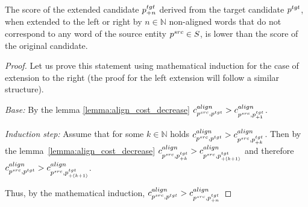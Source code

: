 \begin{corollary} \label{col:shrink_cand}
  The score of the extended candidate \( p_{+n}^{tgt} \) derived from the target
  candidate \( p^{tgt} \), when extended to the left or right by
  \( n \in \mathbb{N} \) non-aligned words that do not correspond to any word
  of the source entity \( p^{src} \in S \), is lower than the score of the original
  candidate.
\end{corollary}
\begin{proof}
  Let us prove this statement using mathematical induction for the case of extension to the right (the proof for the left extension will follow a similar structure).

  \textit{Base:} By the lemma \ref{lemma:align_cost_decrease} \( c_{p^{src}, p^{tgt}}^{align} > c_{p^{src}, p_{+1}^{tgt}}^{align} \).

  \textit{Induction step:} Assume that for some \( k \in \mathbb{N} \) holds \( c_{p^{src}, p^{tgt}}^{align} > c_{p^{src}, p_{+k}^{tgt}}^{align} \).
  Then by the lemma~\ref{lemma:align_cost_decrease} \( c_{p^{src}, p_{+k}^{tgt}}^{align} > c_{p^{src}, p_{+(k+1)}^{tgt}}^{align} \) and therefore
  \( c_{p^{src}, p^{tgt}}^{align} > c_{p^{src}, p_{+(k+1)}^{tgt}}^{align} \).

  Thus, by the mathematical induction, \( c_{p^{src}, p^{tgt}}^{align} > c_{p^{src}, p_{+n}^{tgt}}^{align}   \)
\end{proof}

